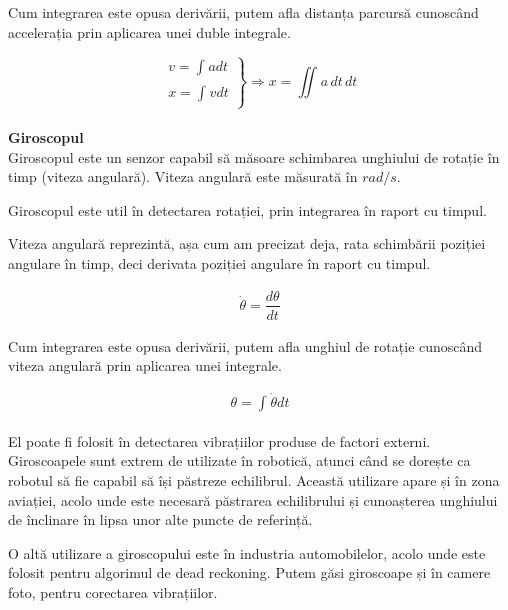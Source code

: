 \documentclass[12pt, a4paper, oneside]{article}
\begin{document}
Cum integrarea este opusa derivării, putem afla distanța parcursă cunoscând accelerația prin aplicarea unei duble integrale.

\begin{equation} 
\left.
\begin{aligned} v = \int_{}^{} a dt\\ x = \int_{}^{} v dt \end{aligned} \right\} \Rightarrow x = \iint_{} a \,dt\,dt
\end{equation}\\


\textbf{Giroscopul}\\
Giroscopul este un senzor capabil să măsoare schimbarea unghiului de rotație în timp (viteza angulară). Viteza angulară este măsurată în $rad/s$.

Giroscopul este util în detectarea rotației, prin integrarea în raport cu timpul. 

Viteza angulară reprezintă, așa cum am precizat deja, rata schimbării poziției angulare în timp, deci derivata poziției angulare în raport cu timpul.

\begin{equation} 
\left.
\begin{aligned} \dot{\theta} = \dfrac{d \theta}{dt} \end{aligned}
\right.
\end{equation} 

Cum integrarea este opusa derivării, putem afla unghiul de rotație cunoscând viteza angulară prin aplicarea unei integrale.

\begin{equation} 
\left.
\begin{aligned} \theta = \int_{}^{} \dot{\theta} dt \end{aligned}
\right.
\end{equation} 

El poate fi folosit în detectarea vibrațiilor produse de factori externi. Giroscoapele sunt extrem de utilizate în robotică, atunci când se dorește ca robotul să fie capabil să își păstreze echilibrul. Această utilizare apare și în zona aviației, acolo unde este necesară păstrarea echilibrului și cunoașterea unghiului de înclinare în lipsa unor alte puncte de referință.

O altă utilizare a giroscopului este în industria automobilelor, acolo unde este folosit pentru algorimul de dead reckoning. Putem găsi giroscoape și în camere foto, pentru corectarea vibrațiilor.
\end{document}
